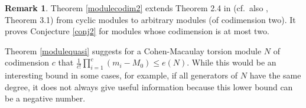 \documentclass[12pt,twoside]{amsart}
\numberwithin{equation}{section}
\theoremstyle{definition}
\newtheorem{remark}[theorem]{Remark}
\begin{document}
\begin{remark}
Theorem \ref{modulecodim2} extends Theorem 2.4 in \cite{roemer} (cf.\ also \cite{H},
Theorem 3.1) from cyclic modules to arbitrary modules (of codimension two). It proves
Conjecture \ref{conj2} for modules whose codimension is at most two.
\end{remark}

Theorem \ref{modulequasi} suggests for a Cohen-Macaulay torsion module $N$ of codimension
$c$ that $\frac{1}{c!} \prod_{i=1}^c (m_i - M_0) \leq e(N)$. While this would be an
interesting bound in some cases, for example, if all generators of $N$ have the same
degree, it does not always give useful information because this lower bound can be a
negative number.

\end{document}
